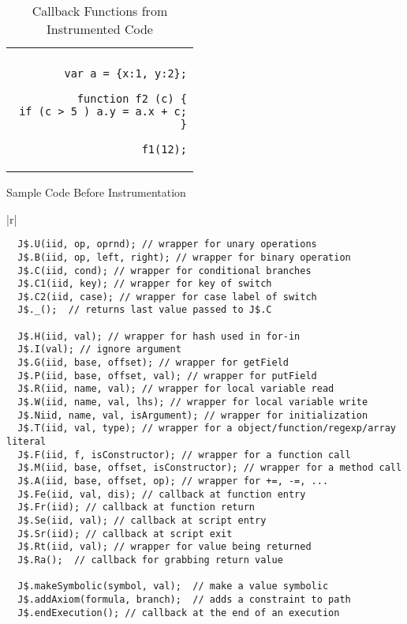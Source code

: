 \documentclass{sig-alternate}
\begin{document}
\begin{table*}
\begin{minipage}{0.28\textwidth}
\begin{tabular}{|r|}
\hline\\
{\scriptsize
\begin{lstlisting}
var a = {x:1, y:2};

function f2 (c) {
 if (c > 5 ) a.y = a.x + c;
}

f1(12);
\end{lstlisting}
}\\
\hline
\end{tabular}
\caption{Sample Code Before Instrumentation}
\label{tab:original}
\end{minipage}
\begin{minipage}{0.71\textwidth}
\begin{tabular}{|r|}
\hline\\
{\scriptsize
\begin{lstlisting}
  J$.U(iid, op, oprnd); // wrapper for unary operations
  J$.B(iid, op, left, right); // wrapper for binary operation
  J$.C(iid, cond); // wrapper for conditional branches
  J$.C1(iid, key); // wrapper for key of switch
  J$.C2(iid, case); // wrapper for case label of switch
  J$._();  // returns last value passed to J$.C

  J$.H(iid, val); // wrapper for hash used in for-in
  J$.I(val); // ignore argument
  J$.G(iid, base, offset); // wrapper for getField
  J$.P(iid, base, offset, val); // wrapper for putField
  J$.R(iid, name, val); // wrapper for local variable read
  J$.W(iid, name, val, lhs); // wrapper for local variable write
  J$.Niid, name, val, isArgument); // wrapper for initialization
  J$.T(iid, val, type); // wrapper for a object/function/regexp/array literal
  J$.F(iid, f, isConstructor); // wrapper for a function call
  J$.M(iid, base, offset, isConstructor); // wrapper for a method call
  J$.A(iid, base, offset, op); // wrapper for +=, -=, ...
  J$.Fe(iid, val, dis); // callback at function entry
  J$.Fr(iid); // callback at function return
  J$.Se(iid, val); // callback at script entry
  J$.Sr(iid); // callback at script exit
  J$.Rt(iid, val); // wrapper for value being returned
  J$.Ra();  // callback for grabbing return value

  J$.makeSymbolic(symbol, val);  // make a value symbolic
  J$.addAxiom(formula, branch);  // adds a constraint to path
  J$.endExecution(); // callback at the end of an execution

\end{lstlisting}
}\\
\hline
\end{tabular}
\caption{Callback Functions from Instrumented Code}
\label{tab:callbacks}
\end{minipage}
\end{table*}
\end{document}
